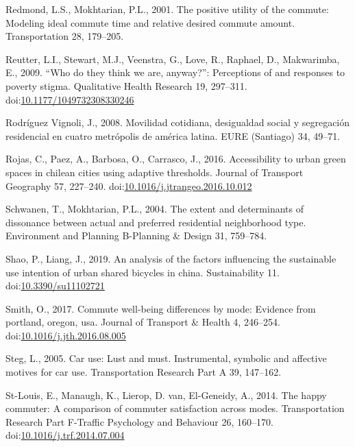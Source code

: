 \documentclass[]{elsarticle} %
\begin{document}
\leavevmode\hypertarget{ref-Redmond2001positive}{}%
Redmond, L.S., Mokhtarian, P.L., 2001. The positive utility of the
commute: Modeling ideal commute time and relative desired commute
amount. Transportation 28, 179--205.

\leavevmode\hypertarget{ref-Reutter2009who}{}%
Reutter, L.I., Stewart, M.J., Veenstra, G., Love, R., Raphael, D.,
Makwarimba, E., 2009. ``Who do they think we are, anyway?'': Perceptions
of and responses to poverty stigma. Qualitative Health Research 19,
297--311.
doi:\href{https://doi.org/10.1177/1049732308330246}{10.1177/1049732308330246}

\leavevmode\hypertarget{ref-RodriguesVignoli2008}{}%
Rodríguez Vignoli, J., 2008. Movilidad cotidiana, desigualdad social y
segregación residencial en cuatro metrópolis de américa latina. EURE
(Santiago) 34, 49--71.

\leavevmode\hypertarget{ref-Rojas2016}{}%
Rojas, C., Paez, A., Barbosa, O., Carrasco, J., 2016. Accessibility to
urban green spaces in chilean cities using adaptive thresholds. Journal
of Transport Geography 57, 227--240.
doi:\href{https://doi.org/10.1016/j.jtrangeo.2016.10.012}{10.1016/j.jtrangeo.2016.10.012}

\leavevmode\hypertarget{ref-Schwanen2004extent}{}%
Schwanen, T., Mokhtarian, P.L., 2004. The extent and determinants of
dissonance between actual and preferred residential neighborhood type.
Environment and Planning B-Planning \& Design 31, 759--784.

\leavevmode\hypertarget{ref-Shao2019analysis}{}%
Shao, P., Liang, J., 2019. An analysis of the factors influencing the
sustainable use intention of urban shared bicycles in china.
Sustainability 11.
doi:\href{https://doi.org/10.3390/su11102721}{10.3390/su11102721}

\leavevmode\hypertarget{ref-Smith2017commute}{}%
Smith, O., 2017. Commute well-being differences by mode: Evidence from
portland, oregon, usa. Journal of Transport \& Health 4, 246--254.
doi:\href{https://doi.org/10.1016/j.jth.2016.08.005}{10.1016/j.jth.2016.08.005}

\leavevmode\hypertarget{ref-Steg2005car}{}%
Steg, L., 2005. Car use: Lust and must. Instrumental, symbolic and
affective motives for car use. Transportation Research Part A 39,
147--162.

\leavevmode\hypertarget{ref-Stlouis2014happy}{}%
St-Louis, E., Manaugh, K., Lierop, D. van, El-Geneidy, A., 2014. The
happy commuter: A comparison of commuter satisfaction across modes.
Transportation Research Part F-Traffic Psychology and Behaviour 26,
160--170.
doi:\href{https://doi.org/10.1016/j.trf.2014.07.004}{10.1016/j.trf.2014.07.004}
\end{document}

